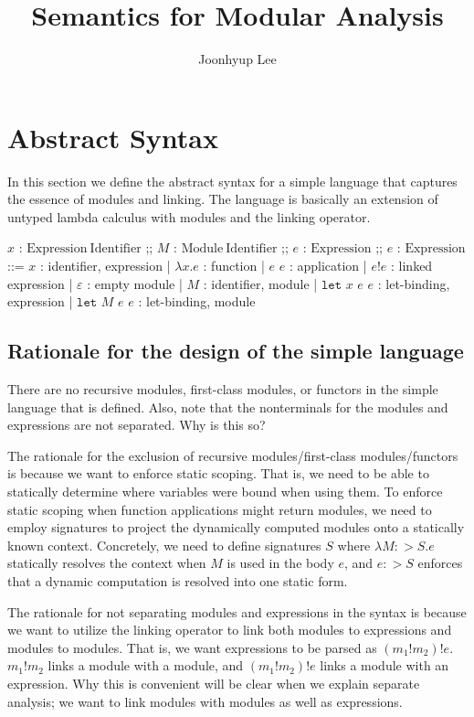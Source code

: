 \documentclass{article}
\title{Semantics for Modular Analysis}
\author{Joonhyup Lee}
\date{}
\theoremstyle{definition}
\newcommand*{\Expr}{\text{Expr}}
\newcommand*{\ExprVar}{\text{ExprVar}}
\newcommand*{\ModVar}{\text{ModVar}}
\newcommand*{\link}[2]{{#1}\mathtt{!}{#2}}
\newcommand*{\Let}{\mathtt{let}}
\begin{document}
\maketitle

\section{Abstract Syntax}

In this section we define the abstract syntax for a simple language that captures the essence of modules and linking.
The language is basically an extension of untyped lambda calculus with modules and the linking operator.

\begin{bnfgrammar}
  $x$ : $\mathrm{Expression\:Identifier}$ \in \ExprVar
  ;;
  $M$ : $\mathrm{Module\:Identifier}$ \in \ModVar
  ;;
  $e$ : $\mathrm{Expression}$ \in \Expr
  ;;
  $e$ : $\mathrm{Expression}$ ::= $x$ : identifier, expression
  | $\lambda x.e$ : function
  | $e$ $e$ : application
  | $\link{e}{e}$ : linked expression
  | $\varepsilon$ : empty module
  | $M$ : identifier, module
  | $\Let$ $x$ $e$ $e$ : let-binding, expression
  | $\Let$ $M$ $e$ $e$ : let-binding, module
\end{bnfgrammar}

\subsection{Rationale for the design of the simple language}

There are no recursive modules, first-class modules, or functors in the simple language that is defined.
Also, note that the nonterminals for the modules and expressions are not separated. Why is this so?

The rationale for the exclusion of recursive modules/first-class modules/functors is because we want to enforce static scoping.
That is, we need to be able to statically determine where variables were bound when using them.
To enforce static scoping when function applications might return modules, we need to employ signatures to project the dynamically computed modules onto a statically known context.
Concretely, we need to define signatures $S$ where $\lambda M:>S.e$ statically resolves the context when $M$ is used in the body $e$, and $e:>S$ enforces that a dynamic computation is resolved into one static form.

The rationale for not separating modules and expressions in the syntax is because we want to utilize the linking operator to link both modules to expressions and modules to modules.
That is, we want expressions to be parsed as $(m_1!m_2)!e$.
$\link{m_1}{m_2}$ links a module with a module, and $(m_1!m_2)!e$ links a module with an expression.
Why this is convenient will be clear when we explain separate analysis; we want to link modules with modules as well as expressions.
\end{document}
